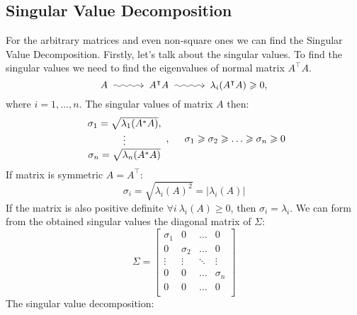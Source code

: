 \subsection*{Singular Value Decomposition}
For the arbitrary matrices and even non-square ones we can find the Singular Value Decomposition. Firstly, let's talk about the singular values. To find the singular values we need to find the eigenvalues of normal matrix $A^\intercal A$.
\[
      A \xymatrix@C=3em{{}\ar@{~>}[r]&{}} A^\intercal A \xymatrix@C=3em{{}\ar@{~>}[r]&{}} \lambda_i(A^\intercal A) \geq 0,
\]
where $i=1, \ldots, n$.  The singular values of matrix $A$ then:
\[
    \begin{array}{c}
        \sigma_1 = \sqrt{\lambda_1(A^*A)}, \\
        \vdots \\
        \sigma_n = \sqrt{\lambda_n(A^*A)}
    \end{array}, \hspace*{0.5cm} \sigma_1 \geq \sigma_2 \geq \ldots \geq \sigma_n \geq 0
\]
If matrix is symmetric $A = A^\intercal$:
\[
    \sigma_i = \sqrt{\lambda_i(A)^2} = |\lambda_i (A)|  
\]
If the matrix is also positive definite $\forall i \ \lambda_i(A) \geq 0$, then $\sigma_i = \lambda_i$.
We can form from the obtained singular values the diagonal matrix of $\Sigma$:
\[
    \Sigma = \begin{bmatrix}
        \sigma_{1} & 0 & \dots & 0 \\
        0 & \sigma_{2} & \dots & 0 \\
        \vdots & \vdots & \ddots & \vdots \\
        0 & 0 & \dots & \sigma_{n} \\
        0 & 0 & \ldots & 0 \\
    \end{bmatrix}
\]
The singular value decomposition:

